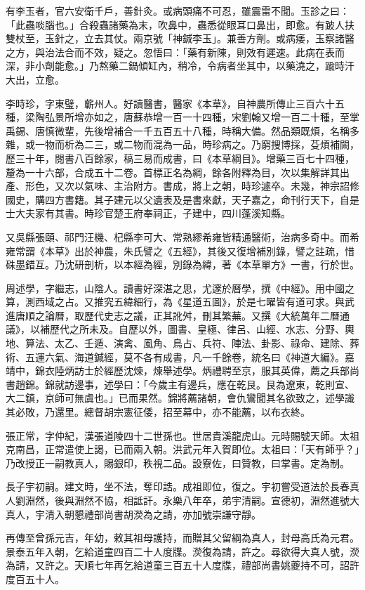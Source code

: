 \begin{pinyinscope}
有李玉者，官六安衛千戶，善針灸。或病頭痛不可忍，雖震雷不聞。玉診之曰：「此蟲啖腦也。」合殺蟲諸藥為末，吹鼻中，蟲悉從眼耳口鼻出，即愈。有跛人扶雙杖至，玉針之，立去其仗。兩京號「神鍼李玉」。兼善方劑。或病痿，玉察諸醫之方，與治法合而不效，疑之。忽悟曰：「藥有新陳，則效有遲速。此病在表而深，非小劑能愈。」乃熬藥二鍋傾缸內，稍冷，令病者坐其中，以藥澆之，踰時汗大出，立愈。

李時珍，字東璧，蘄州人。好讀醫書，醫家《本草》，自神農所傳止三百六十五種，梁陶弘景所增亦如之，唐蘇恭增一百一十四種，宋劉翰又增一百二十種，至掌禹錫、唐慎微輩，先後增補合一千五百五十八種，時稱大備。然品類既煩，名稱多雜，或一物而析為二三，或二物而混為一品，時珍病之。乃窮搜博採，芟煩補闕，歷三十年，閱書八百餘家，稿三易而成書，曰《本草綱目》。增藥三百七十四種，釐為一十六部，合成五十二卷。首標正名為綱，餘各附釋為目，次以集解詳其出產、形色，又次以氣味、主治附方。書成，將上之朝，時珍遽卒。未幾，神宗詔修國史，購四方書籍。其子建元以父遺表及是書來獻，天子嘉之，命刊行天下，自是士大夫家有其書。時珍官楚王府奉祠正，子建中，四川蓬溪知縣。

又吳縣張頤、祁門汪機、杞縣李可大、常熟繆希雍皆精通醫術，治病多奇中。而希雍常謂《本草》出於神農，朱氏譬之《五經》，其後又復增補別錄，譬之註疏，惜硃墨錯互。乃沈研剖析，以本經為經，別錄為緯，著《本草單方》一書，行於世。

周述學，字繼志，山陰人。讀書好深湛之思，尤邃於曆學，撰《中經》。用中國之算，測西域之占。又推究五緯細行，為《星道五圖》，於是七曜皆有道可求。與武進唐順之論曆，取歷代史志之議，正其訛舛，刪其繁蕪。又撰《大統萬年二曆通議》，以補歷代之所未及。自歷以外，圖書、皇極、律呂、山經、水志、分野、輿地、算法、太乙、壬遁、演禽、風角、鳥占、兵符、陣法、卦影、祿命、建除、葬術、五運六氣、海道鍼經，莫不各有成書，凡一千餘卷，統名曰《神道大編》。嘉靖中，錦衣陸炳訪士於經歷沈煉，煉舉述學。炳禮聘至京，服其英偉，薦之兵部尚書趙錦。錦就訪邊事，述學曰：「今歲主有邊兵，應在乾艮。艮為遼東，乾則宣、大二鎮，京師可無虞也。」已而果然。錦將薦諸朝，會仇鸞聞其名欲致之，述學識其必敗，乃還里。總督胡宗憲征倭，招至幕中，亦不能薦，以布衣終。

張正常，字仲紀，漢張道陵四十二世孫也。世居貴溪龍虎山。元時賜號天師。太祖克南昌，正常遣使上謁，已而兩入朝。洪武元年入賀即位。太祖曰：「天有師乎？」乃改授正一嗣教真人，賜銀印，秩視二品。設寮佐，曰贊教，曰掌書。定為制。

長子宇初嗣。建文時，坐不法，奪印誥。成祖即位，復之。宇初嘗受道法於長春真人劉淵然，後與淵然不協，相詆訐。永樂八年卒，弟宇清嗣。宣德初，淵然進號大真人，宇清入朝懇禮部尚書胡濙為之請，亦加號崇謙守靜。

再傳至曾孫元吉，年幼，敕其祖母護持，而贈其父留綱為真人，封母高氏為元君。景泰五年入朝，乞給道童四百二十人度牒。濙復為請，許之。尋欲得大真人號，濙為請，又許之。天順七年再乞給道童三百五十人度牒，禮部尚書姚夔持不可，詔許度百五十人。


\end{pinyinscope}
